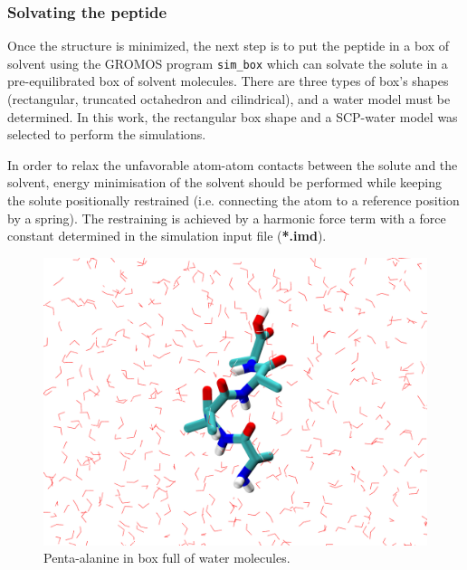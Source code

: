 \subsubsection{Solvating the peptide}\label{subsubsec:sim_box}
Once the structure is minimized, the next step is to put the peptide in a box of solvent using the GROMOS program \texttt{sim\_box} which can solvate the solute in a pre-equilibrated box of solvent molecules. There are three types of box's shapes (rectangular, truncated octahedron and cilindrical), and a water model must be determined. In this work, the rectangular box shape and a SCP-water model was selected to perform the simulations. 

In order to relax the unfavorable atom-atom contacts between the solute and the solvent, energy minimisation of the solvent should be performed while keeping the solute positionally restrained (i.e. connecting the atom to a reference position by a spring). The restraining is achieved by a harmonic force term with a force constant determined in the simulation input file (\textbf{*.imd}). 
\begin{figure}[h]
    \centering
    \includegraphics[scale=0.18]{Figures/Chapter_5/sim_box.png}
    \caption{Penta-alanine in box full of water molecules.}
    \label{fig:sim_box}
\end{figure}

